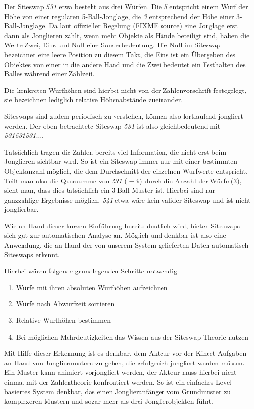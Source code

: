 \documentclass[12pt,a4paper,ngerman]{scrartcl}
\begin{document}
Der Siteswap \textit{531} etwa besteht aus drei Würfen. Die \textit{5} entspricht
einem Wurf der Höhe von einer regulären 5-Ball-Jonglage, die \textit{3} entsprechend
der Höhe einer 3-Ball-Jonglage. Da laut offizieller Regelung (FIXME source) eine
Jonglage erst dann als Jonglieren zählt, wenn mehr Objekte als Hände beteiligt sind,
haben die Werte Zwei, Eins und Null eine Sonderbedeutung. Die Null im Siteswap
bezeichnet eine leere Position zu diesem Takt, die Eins ist ein Übergeben des
Objektes von einer in die andere Hand und die Zwei bedeutet ein Festhalten des Balles
während einer Zählzeit.

Die konkreten Wurfhöhen sind hierbei nicht von der Zahlenvorschrift festegelegt, sie
bezeichnen lediglich relative Höhenabstände zueinander.

Siteswaps sind zudem periodisch zu verstehen, können also fortlaufend jongliert
werden. Der oben betrachtete Siteswap \textit{531} ist also gleichbedeutend mit
\textit{531531531$\dots$}.

Tatsächlich tragen die Zahlen bereits viel Information, die nicht erst beim
Jonglieren sichtbar wird. So ist ein Siteswap immer nur mit einer bestimmten
Objektanzahl möglich, die dem Durchschnitt der einzelnen Wurfwerte entspricht.
Teilt man also die Quersumme von \textit{531} ($= 9$) durch die Anzahl der Würfe
($3$), sieht man, dass dies tatsächlich ein 3-Ball-Muster ist. Hierbei sind nur
ganzzahlige Ergebnisse möglich. \textit{541} etwa wäre kein valider Siteswap und ist
nicht jonglierbar.

Wie an Hand dieser kurzen Einführung bereits deutlich wird, bieten Siteswaps sich gut
zur automatischen Analyse an. Möglich und denkbar ist also eine Anwendung, die an
Hand der von unserem System gelieferten Daten automatisch Siteswaps erkennt.

Hierbei wären folgende grundlegenden Schritte notwendig.

\begin{enumerate}
\item Würfe mit ihren absoluten Wurfhöhen aufzeichnen
\item Würfe nach Abwurfzeit sortieren
\item Relative Wurfhöhen bestimmen
\item Bei möglichen Mehrdeutigkeiten das Wissen aus der Siteswap Theorie nutzen
\end{enumerate}

Mit Hilfe dieser Erkennung ist es denkbar, dem Akteur vor der Kinect Aufgaben an Hand
von Jongliermustern zu geben, die erfolgreich jongliert werden müssen. Ein Muster
kann animiert vorjongliert werden, der Akteur muss hierbei nicht einmal mit der
Zahlentheorie konfrontiert werden. So ist ein einfaches Level-basiertes System
denkbar, das einen Jonglieranfänger vom Grundmuster zu komplexeren Mustern und
sogar mehr als drei Jonglierobjekten führt.
\end{document}

